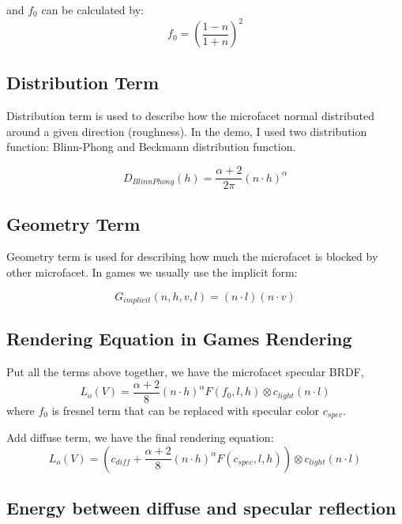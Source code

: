\documentclass[12pt]{report}
\begin{document}
and \(f_{0}\) can be calculated by:
\begin{equation}
f_{0} = (\frac{1-n}{1+n})^2
\label{eq:fresnel_reflectance}
\end{equation}

\subsection{Distribution Term} 
Distribution term is used to describe how the microfacet normal distributed around a given direction (roughness). In the demo, I used two distribution function: Blinn-Phong and Beckmann distribution function.

\begin{equation}
D_{BlinnPhong}(h) = \frac{\alpha + 2}{2\pi}(n \cdot h)^{\alpha}
\label{eq:blinn_phong_distribution_term}
\end{equation}

\subsection{Geometry Term}
Geometry term is used for describing how much the microfacet is blocked by other microfacet. In games we usually use the implicit form: 

\begin{equation}
G_{implicit}(n, h, v, l) = (n \cdot l)(n \cdot v)
\label{eq:implicit_geo_term}
\end{equation}

\subsection{Rendering Equation in Games Rendering} 

Put all the terms above together, we have the microfacet specular BRDF, 
\begin{equation}
L_{o}(V) = \frac{\alpha + 2}{8}(n \cdot h)^{\alpha}F(f_{0},l,h)\otimes c_{light}(n \cdot l)
\label{eq:microfacet_spec_lo}
\end{equation}
where \(f_{0}\) is fresnel term that can be replaced with specular color \(c_{spec}\).


Add diffuse term, we have the final rendering equation:
\begin{equation}
L_{o}(V) = (c_{diff} + \frac{\alpha + 2}{8}(n \cdot h)^{\alpha}F(c_{spec},l,h)) \otimes c_{light}(n \cdot l)
\label{eq:microfacet_render_eq}
\end{equation}

\subsection{Energy between diffuse and specular reflection}
\end{document}
